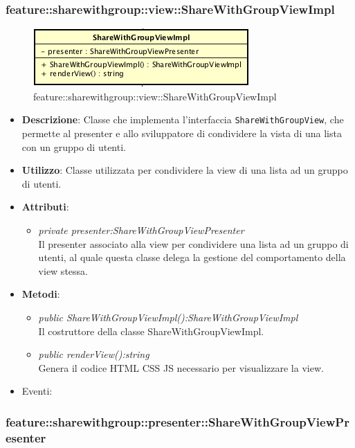 \subsubsection{feature::sharewithgroup::view::ShareWithGroupViewImpl}

\label{feature::sharewithgroup::view::ShareWithGroupViewImpl}
\begin{figure}[ht]
	\centering
	\includegraphics[scale=0.5]{Sezioni/SottosezioniST/img/app/ShareWithGroupViewImpl.png}
	\caption{feature::sharewithgroup::view::ShareWithGroupViewImpl}
\end{figure}

\begin{itemize}
\item \textbf{Descrizione}: Classe che implementa l'interfaccia \texttt{ShareWithGroupView}, che permette al presenter e allo sviluppatore di condividere la vista di una lista con un gruppo di utenti.
\item \textbf{Utilizzo}: Classe utilizzata per condividere la view di una lista ad un gruppo di utenti.
\item \textbf{Attributi}:
	\begin{itemize}
	\item \textit{private presenter:ShareWithGroupViewPresenter}\\
	Il presenter associato alla view per condividere una lista ad un gruppo di utenti, al quale questa classe delega la gestione del comportamento della view stessa.
	\end{itemize} 
\item \textbf{Metodi}:
	\begin{itemize}
	\item \textit{public ShareWithGroupViewImpl():ShareWithGroupViewImpl}\\
	Il costruttore della classe ShareWithGroupViewImpl.
	\item \textit{public renderView():string}\\
		Genera il codice HTML CSS JS necessario per visualizzare la view.
	\end{itemize}
\item{Eventi}:
\end{itemize}

\subsubsection{feature::sharewithgroup::presenter::ShareWithGroupViewPresenter}

